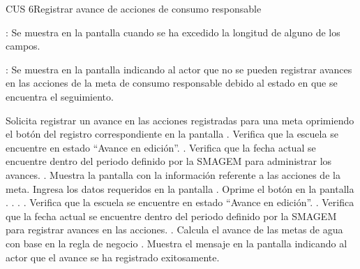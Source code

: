 \begin{UseCase}{CUS 6}{Registrar avance de acciones de consumo responsable}
{\begin{UClist}
        \UCli {}: Se muestra en la pantalla  cuando se ha excedido la longitud de alguno de los campos.    
        
        \UCli {}: Se muestra en la pantalla  indicando al actor que no se pueden registrar avances en las acciones de la meta de consumo responsable debido al estado en que se encuentra el seguimiento.
    \end{UClist}
    }

    


\end{UseCase}


\begin{UCtrayectoria}
    \UCpaso[\UCactor] Solicita registrar un avance en las acciones registradas para una meta oprimiendo el botón \botAutoAjus del registro correspondiente en la pantalla .
    \UCpaso[\UCsist] Verifica que la escuela se encuentre en estado ``Avance en edición''. .
    \UCpaso[\UCsist] Verifica que la fecha actual se encuentre dentro del periodo definido por la SMAGEM para administrar los avances. .
    \UCpaso[\UCsist] Muestra la pantalla  con la información referente a las acciones de la meta.
    \UCpaso[\UCactor] Ingresa los datos requeridos en la pantalla . \label{cus6:RegAvance}
    \UCpaso[\UCactor] Oprime el botón  en la pantalla . . . .
    \UCpaso[\UCsist] Verifica que la escuela se encuentre en estado ``Avance en edición''. .
    \UCpaso[\UCsist] Verifica que la fecha actual se encuentre dentro del periodo definido por la SMAGEM para registrar avances en las acciones. .
    \UCpaso[\UCsist] Calcula el avance de las metas de agua con base en la regla de negocio .
    \UCpaso[\UCsist] Muestra el mensaje  en la pantalla  indicando al actor que el avance se ha registrado exitosamente.
\end{UCtrayectoria}
 
